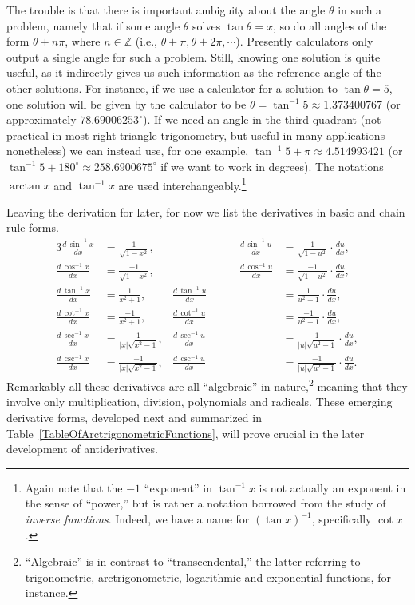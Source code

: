 The trouble is that
there is important ambiguity about the angle $\theta$ in such 
a problem,
namely that if some angle $\theta$ solves $\tan\theta=x$,
so do all angles of the form $\theta+n\pi$, where $n\in\mathbb{Z}$
(i.e., $\theta\pm\pi,\theta\pm2\pi, \cdots$).
Presently calculators only output a single angle for 
such a problem.  Still, knowing one solution is quite useful, as it 
indirectly gives us such information as the reference angle
of the other solutions.  
For instance, if we use a calculator for a solution to 
$\tan\theta=5$, one solution will be given by the calculator
to be $\theta=\tan^{-1}5\approx1.373400767$
(or approximately $78.69006253^\circ$).  If we need an angle in the third
quadrant (not practical in most right-triangle trigonometry,
but useful in many applications nonetheless)
we can instead use, for one example,
$\tan^{-1}5+\pi\approx4.514993421$ (or 
$\tan^{-1}5+180^\circ\approx258.6900675^\circ$ if
we want to work in degrees).  The notations $\arctan x$ and
$\tan^{-1}x$ are used interchangeably.\footnote{%
Again note that the $-1$ ``exponent'' in $\tan^{-1}x$ is not
actually an exponent in the sense of ``power,'' but is rather
a notation borrowed from the study of {\it inverse functions}.
Indeed, we have a name for $(\tan x)^{-1}$, specifically $\cot x$.
}

Leaving the derivation for later, for now we list the derivatives
in basic and chain rule forms.
\begin{alignat}{3}
\frac{d\,\sin^{-1}x}{dx}&=\frac1{\sqrt{1-x^2}},&\qquad\qquad\qquad
\frac{d\,\sin^{-1}u}{dx}&=\frac1{\sqrt{1-u^2}}\cdot\frac{du}{dx},\\
\frac{d\,\cos^{-1}x}{dx}&=\frac{-1}{\sqrt{1-x^2}},&\qquad\qquad\qquad
\frac{d\,\cos^{-1}u}{dx}&=\frac{-1}{\sqrt{1-u^2}}\cdot\frac{du}{dx},\\
\frac{d\,\tan^{-1}x}{dx}&=\frac1{x^2+1},&
\frac{d\,\tan^{-1}u}{dx}&=\frac1{u^2+1}\cdot\frac{du}{dx},\\
\frac{d\,\cot^{-1}x}{dx}&=\frac{-1}{x^2+1},&
\frac{d\,\cot^{-1}u}{dx}&=\frac{-1}{u^2+1}\cdot\frac{du}{dx},\\
\frac{d\,\sec^{-1}x}{dx}&=\frac1{|x|\sqrt{x^2-1}},&
\frac{d\,\sec^{-1}u}{dx}&=\frac1{|u|\sqrt{u^2-1}}\cdot\frac{du}{dx},\\
\frac{d\,\csc^{-1}x}{dx}&=\frac{-1}{|x|\sqrt{x^2-1}},&
\frac{d\,\csc^{-1}u}{dx}&=\frac{-1}{|u|\sqrt{u^2-1}}\cdot\frac{du}{dx}.
\end{alignat}
Remarkably all these  derivatives
are all ``algebraic'' in nature,\footnote{%
``Algebraic'' is in contrast to ``transcendental,'' the latter
referring to trigonometric, arctrigonometric, logarithmic
and exponential functions, for instance.
}
meaning that they involve only multiplication, division,
polynomials and radicals.  These emerging derivative forms,
developed next and 
summarized in Table~\ref{TableOfArctrigonometricFunctions},
will prove crucial in the later development of antiderivatives.


